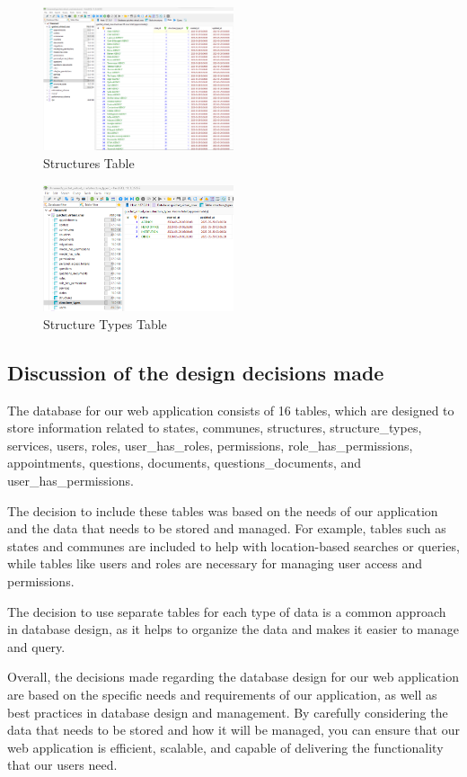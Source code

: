 \begin{figure}[H]
    \centering
    \includegraphics*[width=0.5\textwidth]{SCREENSHOTS/structures.png}
    \caption{Structures Table}
    \label{fig:structures-table}
\end{figure}

\begin{figure}[H]
    \centering
    \includegraphics*[width=0.5\textwidth]{SCREENSHOTS/structuretypes.png}
    \caption{Structure Types Table}
    \label{fig:structures-types-table}
\end{figure}

\subsection{Discussion of the design decisions made}

The database for our web application consists of 16 tables, which are designed to store information related to states, communes, structures, structure\_types, services, users, roles, user\_has\_roles, permissions, role\_has\_permissions, appointments, questions, documents, questions\_documents, and user\_has\_permissions.

The decision to include these tables was  based on the needs of our application and the data that needs to be stored and managed. For example, tables such as states and communes are  included to help with location-based searches or queries, while tables like users and roles are necessary for managing user access and permissions.

The decision to use separate tables for each type of data is a common approach in database design, as it helps to organize the data and makes it easier to manage and query.

Overall, the decisions made regarding the database design for our web application are  based on the specific needs and requirements of our application, as well as best practices in database design and management. By carefully considering the data that needs to be stored and how it will be managed, you can ensure that our web application is efficient, scalable, and capable of delivering the functionality that our users need.